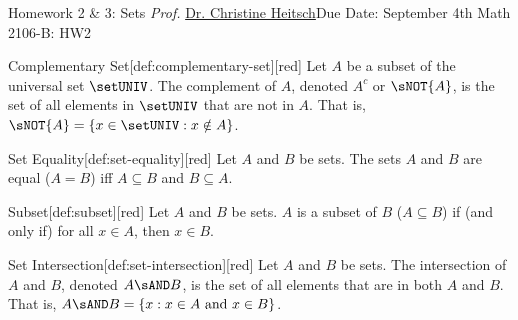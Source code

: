 \newpage{}
{Homework 2 \& 3: Sets}
{\textit{Prof.} \href{https://ceheitsch.github.io/webpage/}{Dr. Christine Heitsch}}{Due Date: September 4th}
{Math 2106-B: HW2}

\newpage
\newpage
\newpage
\newpage





\begin{define}{Complementary Set}[def:complementary-set][red]
  Let $A$ be a subset of the universal set $\setUNIV$. The complement of $A$, 
  denoted $A^c$ or $\sNOT{A}$, is the set of all elements in $\setUNIV$ that are not in $A$. 
  That is, $\sNOT{A} = \{x \in \setUNIV : x \notin A\}$.
\end{define}


\begin{define}{Set Equality}[def:set-equality][red]
  Let $A$ and $B$ be sets. The sets $A$ and $B$ are equal ($A = B$) iff $A \subseteq B$ and $B \subseteq A$.
  \end{define}
  \begin{define}{Subset}[def:subset][red]
    Let $A$ and $B$ be sets. $A$ is a subset of $B$ ($A \subseteq B$) if (and only if) for all $x \in A$, then $x \in B$.
  \end{define}
  \begin{define}{Set Intersection}[def:set-intersection][red]
    Let $A$ and $B$ be sets. The intersection of $A$ and $B$, denoted $A \sAND B$, is the 
    set of all elements that are in both $A$ and $B$. That is, $A \sAND B = \{x : x \in A \text{ and } x \in B\}$.
  \end{define}




